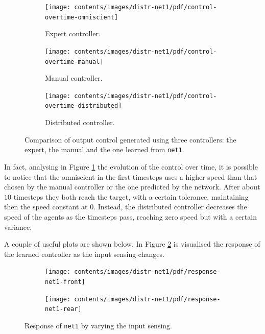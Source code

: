 \begin{figure}[!htb]
	\centering
	\begin{subfigure}[h]{0.3\textwidth}
		\centering
		\texttt{[image: contents/images/distr-net1/pdf/control-overtime-omniscient]}%
		\caption{Expert controller.}
	\end{subfigure}
	\hfill
	\begin{subfigure}[h]{0.3\textwidth}
		\centering
		\texttt{[image: contents/images/distr-net1/pdf/control-overtime-manual]}%
		\caption{Manual controller.}
	\end{subfigure}
	\hfill
	\begin{subfigure}[h]{0.3\textwidth}
		\centering
		\texttt{[image: contents/images/distr-net1/pdf/control-overtime-distributed]}
		\caption{Distributed controller.}
	\end{subfigure}
	\caption[Evaluation of the control learned by \texttt{net1}.]{Comparison 
		of output control generated using three controllers: the expert, the manual 
		and the one learned from \texttt{net1}.}
	\label{fig:net1control}
\end{figure}

In fact, analysing in Figure \ref{fig:net1control} the evolution of the control over 
time, it is possible to notice that the omniscient in the first timesteps uses a 
higher speed than that chosen by the manual controller or the one predicted by 
the network. After about $10$ timesteps they both reach the target, with a 
certain tolerance, maintaining then the speed constant at $0$. Instead, the 
distributed controller decreases the speed of the agents as the timesteps pass, 
reaching zero speed but with a certain variance.

A couple of useful plots are shown below. In Figure \ref{fig:net1responsesensors} 
is visualised the response of the learned controller as the input sensing changes. 
\begin{figure}[!htb]
	\centering
	\begin{subfigure}[h]{0.49\textwidth}
		\centering
		\texttt{[image: contents/images/distr-net1/pdf/response-net1-front]}%
	\end{subfigure}
	\hfill
	\begin{subfigure}[h]{0.49\textwidth}
		\centering
		\texttt{[image: contents/images/distr-net1/pdf/response-net1-rear]}
	\end{subfigure}
	\caption[Response of \texttt{net1} by varying the input sensing.]{Response of 
		\texttt{net1} by varying the input sensing.}
	\label{fig:net1responsesensors}
\end{figure}

